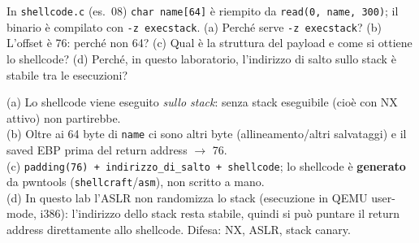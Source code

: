 \question[7]
In \lstinline|shellcode.c| (es.\ 08) \lstinline|char name[64]| è riempito da \lstinline|read(0, name, 300)|; il binario è compilato con \lstinline|-z execstack|.
(a) Perché serve \lstinline|-z execstack|? (b) L'offset è 76: perché non 64? (c) Qual è la struttura del payload e come si ottiene lo shellcode? (d) Perché, in questo laboratorio, l'indirizzo di salto sullo stack è stabile tra le esecuzioni?
\begin{solution}
(a) Lo shellcode viene eseguito \emph{sullo stack}: senza stack eseguibile (cioè con NX attivo) non partirebbe.\\
(b) Oltre ai 64 byte di \lstinline|name| ci sono altri byte (allineamento/altri salvataggi) e il saved EBP prima del return address $\to$ 76.\\
(c) \lstinline|padding(76) + indirizzo_di_salto + shellcode|; lo shellcode è \textbf{generato} da pwntools (\lstinline|shellcraft|/\lstinline|asm|), non scritto a mano.\\
(d) In questo lab l'ASLR non randomizza lo stack (esecuzione in QEMU user-mode, i386): l'indirizzo dello stack resta stabile, quindi si può puntare il return address direttamente allo shellcode. Difesa: NX, ASLR, stack canary.
\end{solution}
